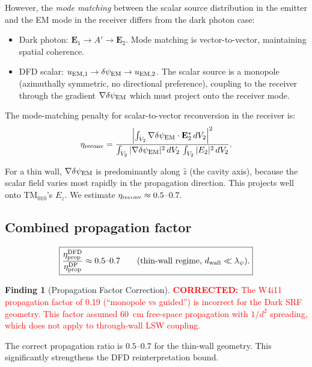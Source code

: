 \documentclass[11pt]{article}
\newcommand{\dpsiEM}{\delta\psi_{\rm EM}}
\newcommand{\corrected}[1]{\textcolor{red}{\textbf{CORRECTED:} #1}}
\theoremstyle{definition}
\newtheorem{finding}[theorem]{Finding}
\theoremstyle{remark}
\begin{document}
However, the \emph{mode matching} between the scalar source distribution
in the emitter and the EM mode in the receiver differs from the
dark photon case:
\begin{itemize}[nosep]
\item Dark photon: $\mathbf{E}_1 \to A' \to \mathbf{E}_2$. Mode
  matching is vector-to-vector, maintaining spatial coherence.
\item DFD scalar: $u_{\rm EM,1} \to \dpsiEM \to u_{\rm EM,2}$.
  The scalar source is a monopole (azimuthally symmetric, no
  directional preference), coupling to the receiver through the
  gradient $\nabla\dpsiEM$ which must project onto the receiver mode.
\end{itemize}

The mode-matching penalty for scalar-to-vector reconversion in
the receiver is:
\begin{equation}
\eta_{\rm reconv} = \frac{\left|\int_{V_2}\nabla\dpsiEM\cdot
\mathbf{E}_2^*\,dV_2\right|^2}
{\int_{V_2}|\nabla\dpsiEM|^2\,dV_2\,\int_{V_2}|E_2|^2\,dV_2}.
\label{eq:eta_reconv}
\end{equation}

For a thin wall, $\nabla\dpsiEM$ is predominantly along $\hat{z}$
(the cavity axis), because the scalar field varies most rapidly
in the propagation direction. This projects well onto TM$_{010}$'s
$E_z$. We estimate $\eta_{\rm reconv} \approx 0.5$--$0.7$.

\subsection{Combined propagation factor}

\begin{equation}
\boxed{
\frac{\eta_{\rm prop}^{\rm DFD}}{\eta_{\rm prop}^{\rm DP}}
\approx 0.5\text{--}0.7
\qquad\text{(thin-wall regime, $d_{\rm wall} \ll \lambda_\psi$)}.
}
\label{eq:prop_ratio}
\end{equation}

\begin{finding}[Propagation Factor Correction]
\label{find:propagation}
\corrected{The W4i11 propagation factor of 0.19 (``monopole vs guided'')
is incorrect for the Dark SRF geometry. This factor assumed 60~cm
free-space propagation with $1/d^2$ spreading, which does not apply
to through-wall LSW coupling.}

The correct propagation ratio is $0.5$--$0.7$ for the thin-wall
geometry. This significantly strengthens the DFD reinterpretation bound.
\end{finding}
\end{document}
